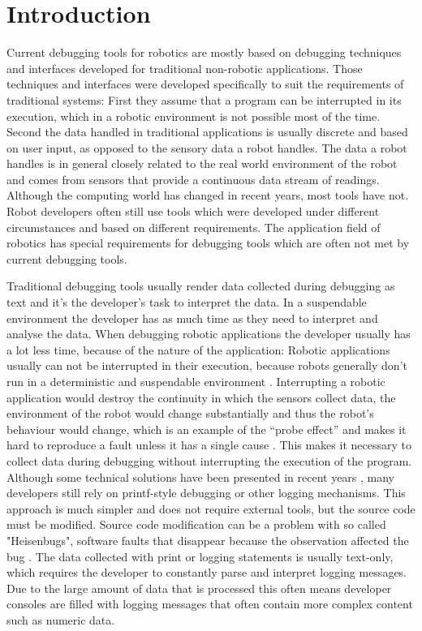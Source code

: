 \chapter{Introduction}


Current debugging tools for robotics are mostly based on debugging techniques and interfaces developed for traditional non-robotic applications. Those techniques and interfaces were developed specifically to suit the requirements of traditional systems: First they assume that a program can be interrupted in its execution, which in a robotic environment is not possible most of the time. Second the data handled in traditional applications is usually discrete and based on user input, as opposed to the sensory data a robot handles. The data a robot handles is in general closely related to the real world environment of the robot and comes from sensors that provide a continuous data stream of readings. Although the computing world has changed in recent years, most tools have not. Robot developers often still use tools which were developed under different circumstances and based on different requirements. The application field of robotics has special requirements for debugging tools which are often not met by current debugging tools.

Traditional debugging tools usually render data collected during debugging as text and it's the developer's task to interpret the data. In a suspendable environment the developer has as much time as they need to interpret and analyse the data. When debugging robotic applications the developer usually has a lot less time, because of the nature of the application: Robotic applications usually can not be interrupted in their execution, because robots generally don't run in a deterministic and suspendable environment \cite{Gumbley2009}. Interrupting a robotic application would destroy the continuity in which the sensors collect data, the environment of the robot would change substantially and thus the robot's behaviour would change, which is an example of the ``probe effect'' and makes it hard to reproduce a fault unless it has a single cause \cite{Gumbley2009}. This makes it necessary to collect data during debugging without interrupting the execution of the program. Although some technical solutions have been presented in recent years \cite{Gumbley2009}, many developers still rely on printf-style debugging or other logging mechanisms. This approach is much simpler and does not require external tools, but the source code must be modified. Source code modification can be a problem with so called "Heisenbugs", software faults that disappear because the observation affected the bug \cite{Grottke2005}. The data collected with print or logging statements is usually text-only, which requires the developer to constantly parse and interpret logging messages. Due to the large amount of data that is processed this often means developer consoles are filled with logging messages that often contain more complex content such as numeric data.

